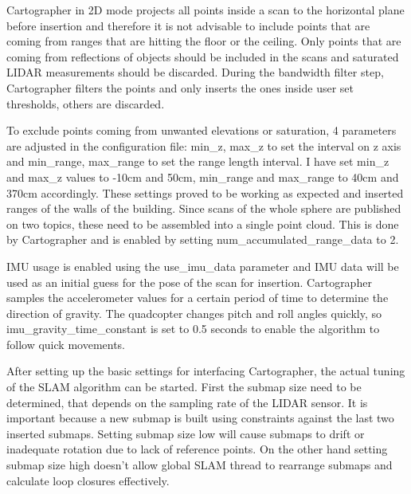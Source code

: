 Cartographer in 2D mode projects all points inside a scan to the horizontal plane before 
insertion and therefore it is not advisable to include points that are coming from ranges 
that are hitting the floor or the ceiling. Only points that are coming from reflections 
of objects should be included in the scans and saturated LIDAR measurements should be 
discarded. During the bandwidth filter step, Cartographer filters the points and only 
inserts the ones inside user set thresholds, others are discarded.

To exclude points coming from unwanted elevations or saturation, 4 parameters are 
adjusted in the configuration file: min\_z, max\_z to set the interval on z axis
and min\_range, max\_range to set the range length interval. I have set min\_z and 
max\_z values to -10cm and 50cm, min\_range and max\_range to 40cm and 370cm accordingly. 
These settings proved to be working as expected and inserted ranges of the walls of 
the building. Since scans of the whole sphere are published on two topics, these need to be 
assembled into a single point cloud. This is done by Cartographer and is enabled by
setting num\_accumulated\_range\_data to 2.

IMU usage is enabled using the use\_imu\_data parameter and IMU data will be used as an 
initial guess for the pose of the scan for insertion. Cartographer samples the 
accelerometer values for a certain period of time to determine the direction of gravity.
The quadcopter changes pitch and roll angles quickly, so imu\_gravity\_time\_constant is 
set to 0.5 seconds to enable the algorithm to follow quick movements.

After setting up the basic settings for interfacing Cartographer, the actual tuning of 
the SLAM algorithm can be started. First the submap size need to be determined, that 
depends on the sampling rate of the LIDAR sensor. It is important because a new submap 
is built using constraints against the last two inserted submaps. 
Setting submap size low will cause submaps to drift 
or inadequate rotation due to lack of reference points. On the other hand setting submap
size high doesn't allow global SLAM thread to rearrange submaps and calculate loop closures
effectively. 

